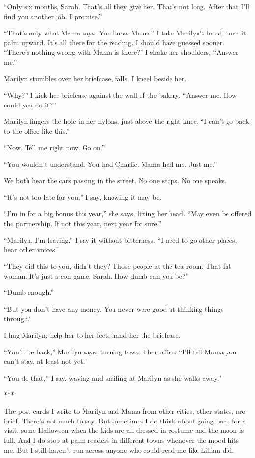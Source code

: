 \documentclass[twoside,10pt]{book}
\begin{document}
``Only six months, Sarah. That's all they give her. That's not long.
After that I'll find you another job. I promise.''

``That's only what Mama says. You know Mama.'' I take Marilyn's hand,
turn it palm upward. It's all there for the reading. I should have
guessed sooner. ``There's nothing wrong with Mama is there?'' I shake
her shoulders, ``Answer me.''

Marilyn stumbles over her briefcase, falls. I kneel beside her.

``Why?'' I kick her briefcase against the wall of the bakery. ``Answer
me. How could you do it?''

Marilyn fingers the hole in her nylons, just above the right knee. ``I
can't go back to the office like this.''

``Now. Tell me right now. Go on.''

``You wouldn't understand. You had Charlie. Mama had me. Just me.''

We both hear the cars passing in the street. No one stops. No one
speaks.

``It's not too late for you,'' I say, knowing it may be.

``I'm in for a big bonus this year,'' she says, lifting her head. ``May
even be offered the partner­ship. If not this year, next year for
sure.''

``Marilyn, I'm leaving.'' I say it without bitterness. ``I need to go
other places, hear other voices.''

``They did this to you, didn't they? Those people at the tea room. That
fat woman. It's just a con game, Sarah. How dumb can you be?''

``Dumb enough.''

``But you don't have any money. You never were good at thinking things
through.''

I hug Marilyn, help her to her feet, hand her the briefcase.

``You'll be back,'' Marilyn says, turning toward her office. ``I'll tell
Mama you can't stay, at least not yet.''

``You do that,'' I say, waving and smiling at Marilyn as she walks
away.''

***

The post cards I write to Marilyn and Mama from other cities, other
states, are brief. There's not much to say. But sometimes I do think
about going back for a visit, some Halloween when the kids are all
dressed in costume and the moon is full. And I do stop at palm readers
in different towns whenever the mood hits me. But I still haven't run
across anyone who could read me like Lillian did.
\end{document}

